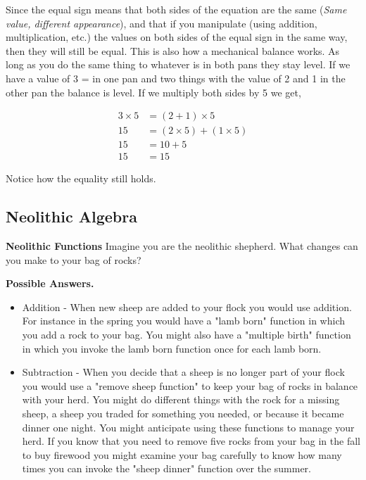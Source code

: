 Since the equal sign means that both sides of the equation are the same (\textit{Same
value, different appearance}), and that if you manipulate (using addition, multiplication,
etc.) the values on both sides of the equal sign in the same way, then they will still be
equal. This is also how a mechanical balance works. As long as you do the same thing to
whatever is in both pans they stay level. If we have a value of 3 = in one pan and two
things with the value of 2 and 1 in the other pan the balance is level. If we multiply
both sides by 5 we get,



\begin{align}
3 \times 5 & = (2 + 1) \times 5 \\
15 & = (2 \times 5) + (1 \times 5) \\
15 & = 10 + 5 \\
15 & = 15
\end{align}





Notice how the equality still holds.




\subsection{Neolithic Algebra}
\label{sss:neol-9c28}




\textbf{Neolithic Functions} Imagine you are the neolithic shepherd. What changes can you make to your bag of rocks?



\textbf{Possible Answers.}



\begin{itemize}
    \item Addition - When new sheep are added to your flock you would use addition. For instance in the spring you would have a "lamb born" function in which you add a rock to your bag. You might also have a "multiple birth" function in which you invoke the lamb born function once for each lamb born.
\end{itemize}

\begin{itemize}
    \item Subtraction - When you decide that a sheep is no longer part of your flock you would use a "remove sheep function" to keep your bag of rocks in balance with your herd. You might do different things with the rock for a missing sheep, a sheep you traded for something you needed, or because it became dinner one night. You might anticipate using these functions to manage your herd. If you know that you need to remove five rocks from your bag in the fall to buy firewood you might examine your bag carefully to know how many times you can invoke the "sheep dinner" function over the summer.
\end{itemize}

